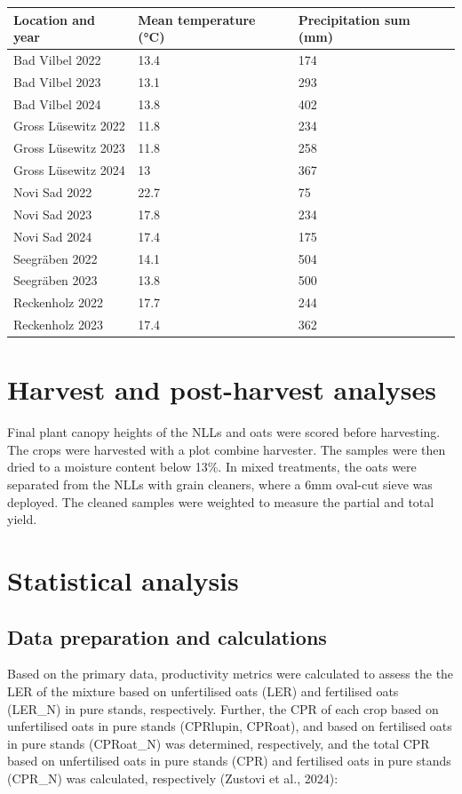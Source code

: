 \documentclass[
  british,
  a4paper,
  DIV=11,
  numbers=noendperiod]{scrreprt}
\begin{document}
\begin{longtable}[]{@{}lll@{}}
\toprule\noalign{}
Location and year & Mean temperature (°C) & Precipitation sum (mm) \\
\midrule\noalign{}
\endhead
\bottomrule\noalign{}
\endlastfoot
Bad Vilbel 2022 & 13.4 & 174 \\
Bad Vilbel 2023 & 13.1 & 293 \\
Bad Vilbel 2024 & 13.8 & 402 \\
Gross Lüsewitz 2022 & 11.8 & 234 \\
Gross Lüsewitz 2023 & 11.8 & 258 \\
Gross Lüsewitz 2024 & 13 & 367 \\
Novi Sad 2022 & 22.7 & 75 \\
Novi Sad 2023 & 17.8 & 234 \\
Novi Sad 2024 & 17.4 & 175 \\
Seegräben 2022 & 14.1 & 504 \\
Seegräben 2023 & 13.8 & 500 \\
Reckenholz 2022 & 17.7 & 244 \\
Reckenholz 2023 & 17.4 & 362 \\
\end{longtable}

\section{Harvest and post-harvest
analyses}\label{harvest-and-post-harvest-analyses}

Final plant canopy heights of the NLLs and oats were scored before
harvesting. The crops were harvested with a plot combine harvester. The
samples were then dried to a moisture content below 13\%. In mixed
treatments, the oats were separated from the NLLs with grain cleaners,
where a 6mm oval-cut sieve was deployed. The cleaned samples were
weighted to measure the partial and total yield.

\section{Statistical analysis}\label{statistical-analysis}

\subsection{Data preparation and
calculations}\label{data-preparation-and-calculations}

Based on the primary data, productivity metrics were calculated to
assess the the LER of the mixture based on unfertilised oats (LER) and
fertilised oats (LER\_N) in pure stands, respectively. Further, the CPR
of each crop based on unfertilised oats in pure stands (CPRlupin,
CPRoat), and based on fertilised oats in pure stands (CPRoat\_N) was
determined, respectively, and the total CPR based on unfertilised oats
in pure stands (CPR) and fertilised oats in pure stands (CPR\_N) was
calculated, respectively (Zustovi et al., 2024):
\end{document}
